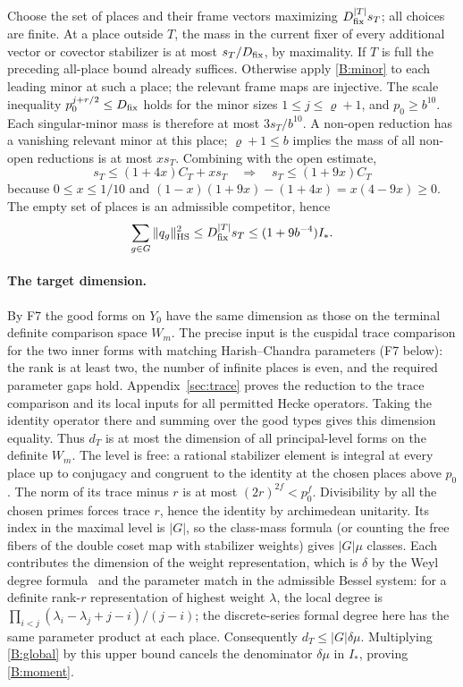 Choose the set of places and their frame vectors maximizing
\(D_{\rm fix}^{|T|}s_T\); all choices are finite. At a place outside
\(T\), the mass in the current fixer of every additional
vector or covector stabilizer is at most \(s_T/D_{\rm fix}\), by
maximality. If \(T\) is full the preceding all-place bound
already suffices. Otherwise apply \eqref{B:minor} to each
leading minor at such a place; the relevant frame maps are
injective. The scale inequality \(p_0^{j+r/2}\le D_{\rm fix}\) holds for
the minor sizes \(1\le j\le\varrho+1\), and \(p_0\ge b^{10}\).
Each singular-minor mass is therefore at most \(3s_T/b^{10}\).
A non-open reduction has a vanishing relevant minor at this
place; \(\varrho+1\le b\) implies the mass of all non-open
reductions is at most \(xs_T\). Combining with the open estimate,
\[
 s_T\le(1+4x)C_T+xs_T\quad\Longrightarrow\quad
 s_T\le(1+9x)C_T
\]
because \(0\le x\le1/10\) and
\((1-x)(1+9x)-(1+4x)=x(4-9x)\ge0\).
The empty set of places is an admissible competitor, hence
\begin{equation}
\label{B:global}
 \sum_{g\in G}\|q_g\|_{\rm HS}^2
 \le D_{\rm fix}^{|T|}s_T\le(1+9b^{-4})I_* .
\end{equation}

\paragraph{The target dimension.}
By F7 the good forms on \(Y_0\) have the same dimension as those on
the terminal definite comparison space \(W_m\). The precise input is the
cuspidal trace comparison for the two inner forms with matching
Harish--Chandra parameters (F7 below): the rank is at least two,
the number of infinite places is even, and the required parameter
gaps hold. Appendix~\ref{sec:trace} proves the reduction to the trace comparison
and its local inputs for all permitted Hecke operators. Taking the identity
operator there and summing over the good types gives this dimension
equality. Thus \(d_T\) is at most the dimension of all
principal-level forms on the definite \(W_m\).
The level is free: a rational stabilizer element is integral at every place up to conjugacy and congruent to the identity at the chosen places above \(p_0\). The norm of its trace minus \(r\) is at most \((2r)^{2f}<p_0^f\). Divisibility by all the chosen primes forces trace \(r\), hence the identity by archimedean unitarity. Its index
in the maximal level is \(|G|\), so the class-mass formula (or
counting the free fibers of the double coset map with stabilizer
weights) gives \(|G|\mu\) classes.
Each contributes the dimension of the weight representation,
which is \(\delta\) by the Weyl degree formula~\cite[Lecture~24]{fultonharris} and the
parameter match in the admissible Bessel system:
for a definite rank-\(r\) representation of highest weight
\(\lambda\), the local degree is
\(\prod_{i<j}(\lambda_i-\lambda_j+j-i)/(j-i)\);
the discrete-series formal degree here has the same parameter
product at each place. Consequently
\(d_T\le |G|\delta\mu\).
Multiplying \eqref{B:global} by this upper bound cancels the
denominator \(\delta\mu\) in \(I_*\), proving \eqref{B:moment}.


